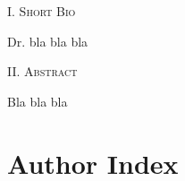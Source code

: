 \documentclass[letterpaper,oneside]{book}
\newenvironment{Figure}
  {\par\medskip\noindent\minipage{\linewidth}}
  {\endminipage\par\medskip}
\begin{document}
\vspace{0.5cm}


\begin{multicols}{2}
\begin{center}
\textsc{I. Short Bio}
\end{center}

Dr. bla bla bla

\begin{center}
\textsc{II. Abstract}
\end{center}

Bla bla bla


\end{multicols}

\newpage
%

\chapter{Author Index}
\begin{multicols}{2}
\printauthorindex
\end{multicols}
\thispagestyle{fancy}
\end{document}
